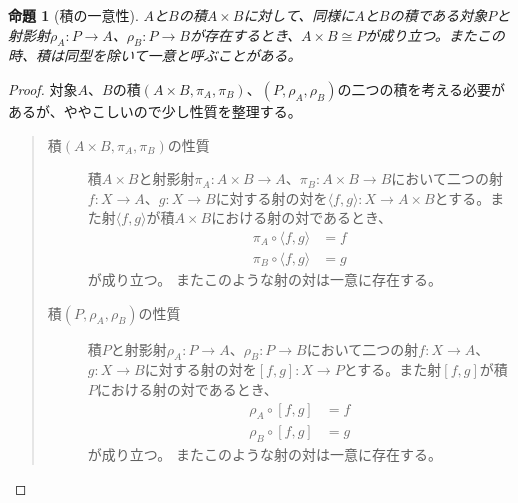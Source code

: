 \documentclass[uplatex,dvipdfmx]{jsarticle}
\newcommand{\arrow}{\rightarrow}
\newcommand{\tuple}[1]{\langle #1\rangle}
\newcommand{\mor}[3]{#1:#2\arrow #3}
\newtheorem{proof}{証明}[section]
\newtheorem{prop}{命題}[section]
\numberwithin{proof}{subsection}
\numberwithin{prop}{subsection}
\numberwithin{define}{subsection}
\begin{document}
	\begin{prop}[積の一意性]
		$A$と$B$の積$A\times B$に対して、同様に$A$と$B$の積である対象$P$と射影射$\mor{\rho_A}{P}{A}$、$\mor{\rho_B}{P}{B}$が存在するとき、$A\times B\cong P$が成り立つ。またこの時、積は同型を除いて一意と呼ぶことがある。
	\end{prop}
	\begin{proof}
		対象$A$、$B$の積$(A\times B,\pi_A,\pi_B)$、$(P,\rho_A,\rho_B)$の二つの積を考える必要があるが、ややこしいので少し性質を整理する。
		\begin{quote}
			\begin{description}
				\item[積$(A\times B,\pi_A,\pi_B)$の性質]
				積$A\times B$と射影射$\mor{\pi_A}{A\times B}{A}$、$\mor{\pi_B}{A\times B}{B}$において二つの射$\mor{f}{X}{A}$、$\mor{g}{X}{B}$に対する射の対を$\mor{\tuple{f,g}}{X}{A\times B}$とする。また射$\tuple{f,g}$が積$A\times B$における射の対であるとき、
				\begin{align*}
					\pi_A\circ\tuple{f,g}&=f\\
					\pi_B\circ\tuple{f,g}&=g
				\end{align*}
				が成り立つ。
				またこのような射の対は一意に存在する。
				\begin{center}
				\end{center}
				\item[積$(P,\rho_A,\rho_B)$の性質]
				積$P$と射影射$\mor{\rho_A}{P}{A}$、$\mor{\rho_B}{P}{B}$において二つの射$\mor{f}{X}{A}$、$\mor{g}{X}{B}$に対する射の対を$\mor{[f,g]}{X}{P}$とする。また射$[f,g]$が積$P$における射の対であるとき、
				\begin{align*}
					\rho_A\circ[f,g]&=f\\
					\rho_B\circ[f,g]&=g
				\end{align*}
				が成り立つ。
				またこのような射の対は一意に存在する。
				\begin{center}
				\end{center}
			\end{description}


\end{quote}
\end{proof}
\end{document}
